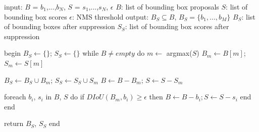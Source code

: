 \begin{algorithm}[caption={DIoU-NMS Algorithm TODO caption to bottom and format}, label={alg1}]
input:  $B$ = {$b_1$,...,$b_N$}, $S$ = {$s_1$,...,$s_N$}, $\epsilon$
        $B$: list of bounding box proposals
        $S$: list of bounding box scores
        $\epsilon$: NMS threshold
output: $B_S \subseteq B$, $B_S = \{b_1,...,b_M\}$
        $B_S$: list of bounding boxes after suppression
        $S_S$: list of bounding box scores after suppression

begin
$B_S \gets \{\}$; $S_S \gets \{\}$
while $B \neq empty$ do
    $m \gets$ argmax($S$)
    $B_m \gets B[m]$; $S_m \gets S[m]$

    $B_S \gets B_S \cup B_m$; $S_S \gets S_S \cup S_m$
    $B \gets B - B_m$; $S \gets S - S_m$

    foreach $b_i$, $s_i$ in $B$, $S$ do
        if $DIoU(B_m, b_i) \geq \epsilon$ then
            $B \gets B - b_i; S \gets S - s_i$
        end
    end

    return $B_S$, $S_S$
end
\end{algorithm}
